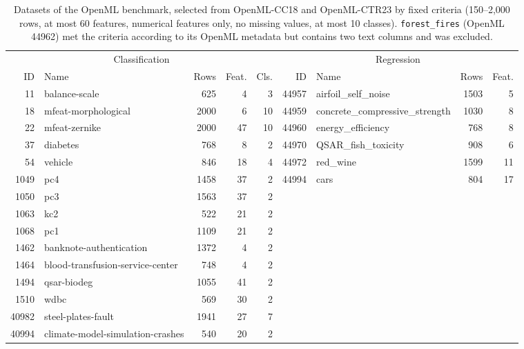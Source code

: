 \begin{table}[t]
\centering
\small
\caption{Datasets of the OpenML benchmark, selected from OpenML-CC18 and OpenML-CTR23 by fixed criteria (150--2{,}000 rows, at most 60 features, numerical features only, no missing values, at most 10 classes). \texttt{forest\_fires} (OpenML 44962) met the criteria according to its OpenML metadata but contains two text columns and was excluded.}
\label{tab:datasets}
\smallskip
\begin{adjustbox}{max width=\textwidth}
\begin{tabular}{rlrrr|rlrr}
\toprule
\multicolumn{5}{c|}{Classification} & \multicolumn{4}{c}{Regression} \\
ID & Name & Rows & Feat. & Cls. & ID & Name & Rows & Feat. \\
\midrule
11 & balance-scale & 625 & 4 & 3 & 44957 & airfoil\_self\_noise & 1503 & 5 \\
18 & mfeat-morphological & 2000 & 6 & 10 & 44959 & concrete\_compressive\_strength & 1030 & 8 \\
22 & mfeat-zernike & 2000 & 47 & 10 & 44960 & energy\_efficiency & 768 & 8 \\
37 & diabetes & 768 & 8 & 2 & 44970 & QSAR\_fish\_toxicity & 908 & 6 \\
54 & vehicle & 846 & 18 & 4 & 44972 & red\_wine & 1599 & 11 \\
1049 & pc4 & 1458 & 37 & 2 & 44994 & cars & 804 & 17 \\
1050 & pc3 & 1563 & 37 & 2 & & & & \\
1063 & kc2 & 522 & 21 & 2 & & & & \\
1068 & pc1 & 1109 & 21 & 2 & & & & \\
1462 & banknote-authentication & 1372 & 4 & 2 & & & & \\
1464 & blood-transfusion-service-center & 748 & 4 & 2 & & & & \\
1494 & qsar-biodeg & 1055 & 41 & 2 & & & & \\
1510 & wdbc & 569 & 30 & 2 & & & & \\
40982 & steel-plates-fault & 1941 & 27 & 7 & & & & \\
40994 & climate-model-simulation-crashes & 540 & 20 & 2 & & & & \\
\bottomrule
\end{tabular}
\end{adjustbox}
\end{table}
